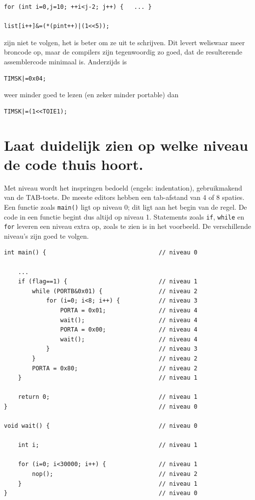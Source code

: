 \documentclass[12pt,a4paper,final,twoside,fleqn]{article}
\def\lstC{\lstinline[style=C]}
\begin{document}
\begin{lstlisting}[style=C,numbers=none,belowcaptionskip=-12pt]
for (int i=0,j=10; ++i<j-2; j++) {	 ... }

list[i++]&=(*(pint++)|(1<<5));
\end{lstlisting}

zijn niet te volgen, het is beter om ze uit te schrijven. Dit levert weliswaar
meer broncode op, maar de compilers zijn tegenwoordig zo goed, dat de resulterende
assemblercode minimaal is. Anderzijds is

\newpage
\begin{lstlisting}[style=C,numbers=none,belowcaptionskip=-12pt]
TIMSK|=0x04;
\end{lstlisting}

weer minder goed te lezen (en zeker minder portable) dan

\begin{lstlisting}[style=C,numbers=none,belowcaptionskip=-12pt]
TIMSK|=(1<<TOIE1);
\end{lstlisting}

\section{Laat duidelijk zien op welke niveau de code thuis hoort.}
Met niveau wordt het inspringen bedoeld (engels: indentation), gebruikmakend van
de TAB-toets. De meeste editors hebben een tab-afstand van 4 of 8 spaties. Een
functie zoals \lstC{main()} ligt op niveau 0; dit ligt aan het begin van de regel.
De code in een functie begint dus altijd op niveau 1. Statements zoals \lstC{if},
\lstC{while} en \lstC{for} leveren een niveau extra op, zoals te zien is in het
voorbeeld. De verschillende niveau's zijn goed te volgen.

\begin{lstlisting}[style=C,caption=Voorbeeld van code met inspringen]
int main() {                                // niveau 0

	...
	if (flag==1) {                          // niveau 1
		while (PORTB&0x01) {                // niveau 2
			for (i=0; i<8; i++) {           // niveau 3
				PORTA = 0x01;               // niveau 4
				wait();                     // niveau 4
				PORTA = 0x00;               // niveau 4
				wait();                     // niveau 4
			}                               // niveau 3
		}                                   // niveau 2
		PORTA = 0x80;                       // niveau 2
	}                                       // niveau 1

	return 0;                               // niveau 1
}                                           // niveau 0

void wait() {                               // niveau 0

	int i;                                  // niveau 1

	for (i=0; i<30000; i++) {               // niveau 1
		nop();                              // niveau 2
	}                                       // niveau 1
}                                           // niveau 0
\end{lstlisting}
\end{document}
